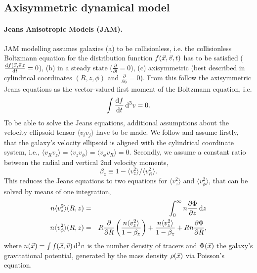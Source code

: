 \subsection{Axisymmetric dynamical model} \label{sec:model_JAM}

\paragraph{Jeans Anisotropic Models (JAM).} JAM modelling assumes galaxies (a) to be collisionless, i.e. the collisionless Boltzmann equation for the distribution function $f(\vec{x},\vec{v},t)$ has to be satisfied ($\frac{\mathop{}\!\mathrm{d} f(\vec{x},\vec{v},t}{\mathop{}\!\mathrm{d} t} = 0$), (b) in a steady state ($\frac{\partial}{\partial t} = 0$), (c) axisymmetric (best described in cylindrical coordinates $(R,z,\phi)$ and $\frac{\partial}{\partial \phi} = 0$). From this follow the axisymmetric Jeans equations as the vector-valued first moment of the Boltzmann equation, i.e.
\begin{equation*}
\int \frac{\mathop{}\!\mathrm{d} f}{\mathop{}\!\mathrm{d} t} \mathop{}\!\mathrm{d^3} v = 0.
\end{equation*}
To be able to solve the Jeans equations, additional assumptions about the velocity ellipsoid tensor $\langle v_i v_j\rangle$ have to be made. We follow \citet{Cap08} and assume firstly, that the galaxy's velocity ellipsoid is aligned with the cylindrical coordinate system, i.e., $\langle v_R v_z\rangle = \langle v_z v_\phi \rangle = \langle v_\phi v_R \rangle = 0$. Secondly, we assume a constant ratio between the radial and vertical 2nd velocity moments, 
\begin{equation}
\beta_z \equiv 1 - \langle v_z^2 \rangle / \langle v_R^2\rangle. \label{eq:bz}
\end{equation}
This reduces the Jeans equations to two equations for $\langle v_z^2 \rangle$ and $\langle v_\phi^2 \rangle$, that can be solved by means of one integration,
\begin{eqnarray}
n \langle v_z^2 \rangle (R,z) &=& \int_0^\infty n \frac{\partial \Phi}{\partial z} \mathop{}\!\mathrm{d} z \label{eq:Jeans1}\\
n \langle v_\phi^2 \rangle (R,z) &=& R \frac{\partial}{\partial R} \left( \frac{n \langle v_z^2 \rangle}{1-\beta_z} \right) + \frac{n \langle v_z^2 \rangle}{1 - \beta_z} + R n \frac{\partial \Phi}{\partial R},\label{eq:Jeans2}
\end{eqnarray}
where $n(\vec{x}) = \int f(\vec{x},\vec{v}) \mathop{}\!\mathrm{d^3} v$ is the number density of tracers and $\Phi(\vec{x})$ the galaxy's gravitational potential, generated by the mass density $\rho(\vec{x})$ via Poisson's equation.
